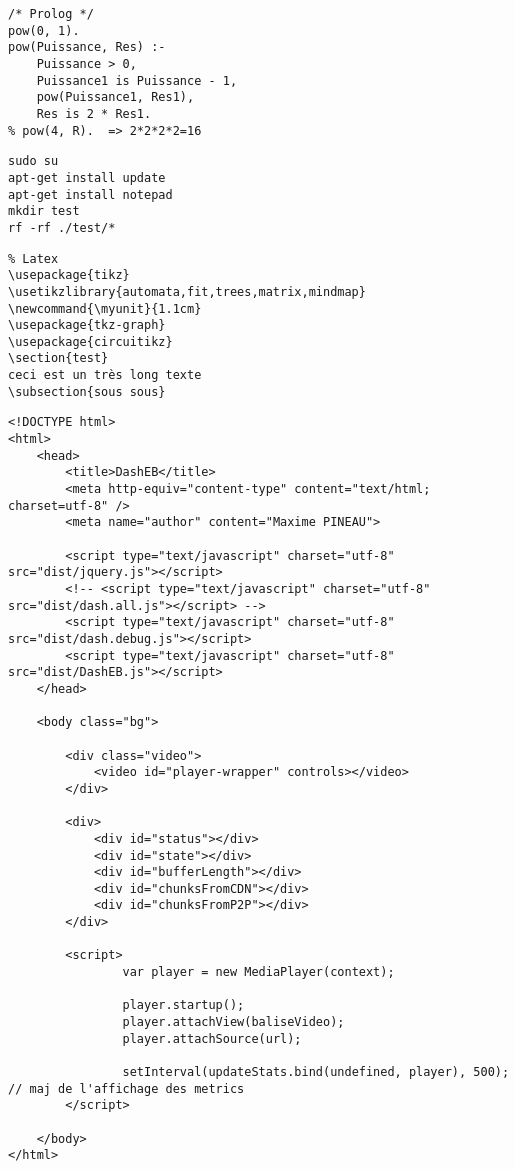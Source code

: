 \begin{verbatim}
/* Prolog */
pow(0, 1).
pow(Puissance, Res) :- 
	Puissance > 0,
	Puissance1 is Puissance - 1,
	pow(Puissance1, Res1),
	Res is 2 * Res1.
% pow(4, R).  => 2*2*2*2=16
\end{verbatim}


\begin{verbatim}
sudo su 
apt-get install update 
apt-get install notepad 
mkdir test
rf -rf ./test/*
\end{verbatim}


\begin{verbatim}
% Latex
\usepackage{tikz}
\usetikzlibrary{automata,fit,trees,matrix,mindmap}
\newcommand{\myunit}{1.1cm}
\usepackage{tkz-graph}
\usepackage{circuitikz}
\section{test}
ceci est un très long texte
\subsection{sous sous}
\end{verbatim}



\begin{verbatim}
<!DOCTYPE html>
<html>
    <head>
        <title>DashEB</title>
        <meta http-equiv="content-type" content="text/html; charset=utf-8" />
        <meta name="author" content="Maxime PINEAU">

        <script type="text/javascript" charset="utf-8" src="dist/jquery.js"></script>
        <!-- <script type="text/javascript" charset="utf-8" src="dist/dash.all.js"></script> -->
        <script type="text/javascript" charset="utf-8" src="dist/dash.debug.js"></script>
        <script type="text/javascript" charset="utf-8" src="dist/DashEB.js"></script>
    </head>
    
    <body class="bg">

        <div class="video">
            <video id="player-wrapper" controls></video>
        </div>

        <div>
            <div id="status"></div>
            <div id="state"></div>
            <div id="bufferLength"></div>
            <div id="chunksFromCDN"></div>
            <div id="chunksFromP2P"></div>
        </div>

        <script>
            	var player = new MediaPlayer(context);

                player.startup();
                player.attachView(baliseVideo);
                player.attachSource(url);

                setInterval(updateStats.bind(undefined, player), 500); // maj de l'affichage des metrics
        </script>

    </body>
</html>
\end{verbatim}


